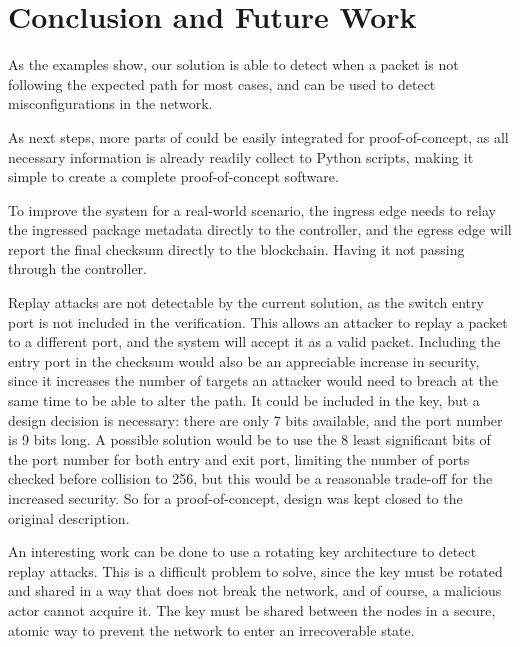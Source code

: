 \section{Conclusion and Future Work}

As the examples show, our solution is able to detect when a packet is not following the expected path for most cases, and can be used to detect misconfigurations in the network.

As next steps, more parts of \pathsec \cite{pathsec} could be easily integrated for proof-of-concept, as all necessary information is already readily collect to Python scripts, making it simple to create 
a complete \pathsec
proof-of-concept software.

To improve the system for a real-world scenario, the ingress edge needs to relay the ingressed package metadata directly to the controller, and the egress edge will report the final checksum directly to the blockchain. Having it not passing through the controller.

Replay attacks are not detectable by the current solution, as the switch entry port is not included in the verification. This allows an attacker to replay a packet to a different port, and the system will accept it as a valid packet. Including the entry port in the checksum would also be an appreciable increase in security, since it increases the number of targets an attacker would need to breach at the same time to be able to alter the path. It could be included in the \siphash key, but a design decision is necessary: there are only 7 bits available, and the port number is 9 bits long. A possible solution would be to use the 8 least significant bits of the port number for both entry and exit port, limiting the number of ports checked before collision to 256, but this would be a reasonable trade-off for the increased security. So for a proof-of-concept, design was kept closed to the original \pathsec description.

An interesting work can be done to use a rotating key architecture to detect replay attacks. This is a difficult problem to solve, since the key must be rotated and shared in a way that does not break the network, and of course, a malicious actor cannot acquire it. The key must be shared between the nodes in a secure, atomic way to prevent the network to enter an irrecoverable state. 


